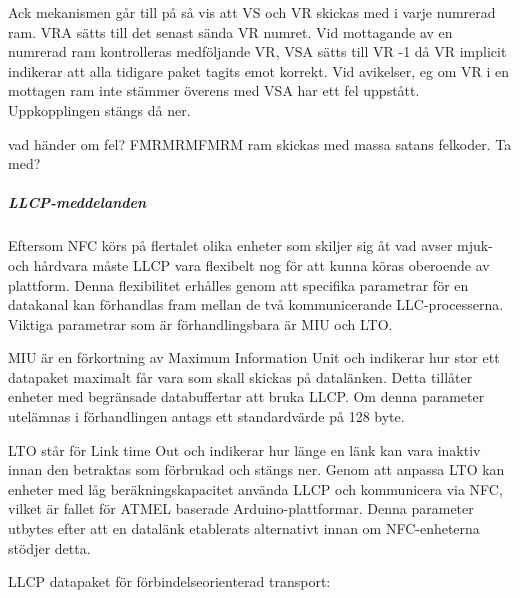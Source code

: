 \documentclass[11pt]{article}
\begin{document}
Ack mekanismen går till på så vis att VS och VR skickas med i varje numrerad ram. VRA sätts till det senast sända VR numret. Vid mottagande av en numrerad ram kontrolleras medföljande VR, VSA sätts till VR -1 då VR implicit indikerar att alla tidigare paket tagits emot korrekt. Vid avikelser, eg om VR i en mottagen ram inte stämmer överens med VSA har ett fel uppstått. Uppkopplingen stängs då ner.

vad händer om fel? FMRMRMFMRM ram skickas med massa satans felkoder. Ta med?

\subparagraph{LLCP-meddelanden}
Eftersom NFC körs på flertalet olika enheter som skiljer sig åt vad avser mjuk- och hårdvara måste LLCP vara flexibelt nog för att kunna köras oberoende av plattform. Denna flexibilitet erhålles genom att specifika parametrar för en datakanal kan förhandlas fram mellan de två kommunicerande LLC-processerna. Viktiga parametrar som är förhandlingsbara är MIU och LTO. 

MIU är en förkortning av Maximum Information Unit och indikerar hur stor ett datapaket maximalt får vara som skall skickas på datalänken. Detta tillåter enheter med begränsade databuffertar att bruka LLCP. Om denna parameter utelämnas i förhandlingen antags ett standardvärde på 128 byte. 

LTO står för Link time Out och indikerar hur länge en länk kan vara inaktiv innan den betraktas som förbrukad och stängs ner. Genom att anpassa LTO kan enheter med låg beräkningskapacitet använda LLCP och kommunicera via NFC, vilket är fallet för ATMEL baserade Arduino-plattformar. Denna parameter utbytes efter att en datalänk etablerats alternativt innan om NFC-enheterna stödjer detta.

LLCP datapaket för förbindelseorienterad transport: 

\end{document}
